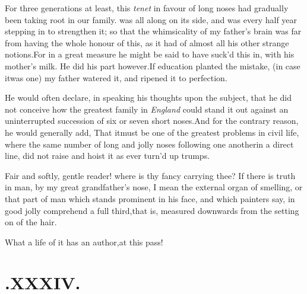 \documentclass{article}
\begin{document}
For three generations at least, this \textit{te\-net} in favour of
long noses had gradually been taking root in our family.\tsh
{} was all along on its side, and
 was every half year stepping in to strengthen
it; so that the whimsicality of my father’s brain was far
from
having the whole honour of this, as it had of almost all his
other strange notions.\tsk For in a great measure he might be
said to have suck’d this in, with his mother’s milk. He did his
part however.\tsh If\break
education planted the mistake, (in case it\break was one) my father
watered it, and ri\-pened it to perfection.

He would often declare, in speaking his thoughts upon the
subject, that he did not conceive how the greatest family in
\textit{England} could stand it out against an uninterrupted
succession of six or seven short noses.\tsk And for the contrary
reason, he would generally add, That it\break must be one of
the greatest problems in civil life, where the same number of long
and jolly noses following one another\break in a direct line, did not
raise and hoist it 
as ever turn’d up trumps.

\tsh Fair and softly, gentle reader!\break
\tsh where is thy fancy carrying thee?\break
\tsh If there is truth in man, by my
great grandfather’s nose, I mean the external organ of smelling,
or that part of man which stands prominent in his
face,
\tsk and which painters say, in good jolly\break
{}\break
comprehend a full third,\tsh that is, measured
downwards from the setting on of the hair.\tsh

\tsh What a life of it has an author,\break at this pass!

\section{.\quad  XXXIV.}
\end{document}
